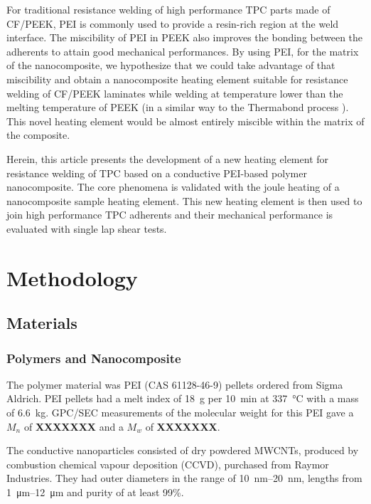 \documentclass[11pt,review,times]{elsarticle}
\begin{document}
For traditional resistance welding of high performance TPC parts made of CF/PEEK, PEI is commonly used to provide a resin-rich region at the weld interface. 
The miscibility of PEI in PEEK \cite{Crevecoeur1991} also improves the bonding between the adherents to attain good mechanical performances. 
By using PEI, for the matrix of the nanocomposite, we hypothesize that we could take advantage of that miscibility and obtain a nanocomposite heating element suitable for resistance welding of CF/PEEK laminates while welding at temperature lower than the melting temperature of PEEK (in a similar way to the Thermabond process \cite{Smiley1991a}). 
This novel heating element would be almost entirely miscible within the matrix of the composite. 

Herein, this article presents the development of a new heating element for resistance welding of TPC based on a conductive PEI-based polymer nanocomposite. 
The core phenomena is validated with the joule heating of a nanocomposite sample heating element. 
This new heating element is then used to join high performance TPC adherents and their mechanical performance is evaluated with single lap shear tests. 

							\section{Methodology}

\subsection{Materials}

\subsubsection{Polymers and Nanocomposite}

The polymer material was PEI (CAS 61128-46-9) pellets ordered from Sigma Aldrich. 
PEI pellets had a melt index of \SI{18}{\gram} per \SI{10}{\minute} at \SI{337}{\celsius} with a mass of \SI{6.6}{\kilogram}. 
GPC/SEC measurements of the molecular weight for this PEI gave a $M_n$ of \textbf{XXXXXXX} and a $M_w$ of \textbf{XXXXXXX}. 

The conductive nanoparticles consisted of dry powdered MWCNTs, produced by combustion chemical vapour deposition (CCVD), purchased from Raymor Industries. 
They had outer diameters in the range of \SIrange{10}{20}{\nano\metre}, lengths from \SIrange{1}{12}{\micro\metre} and purity of at least 99\%.
\end{document}
